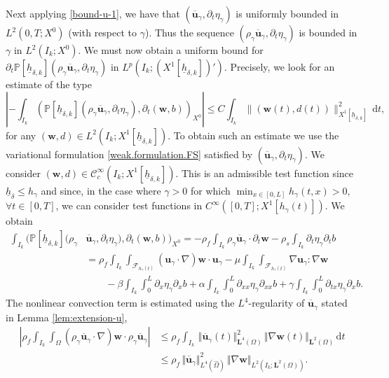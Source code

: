 \documentclass[11pt]{article}
\let\mathcal\mathscr
\theoremstyle{remark}
\theoremstyle{definition}
\newcommand{\norme}[1]{\,\Vert #1\Vert}
\newcommand{\ug}{\boldsymbol{u}}
\newcommand{\dd}{\,\mathrm{d}}
\newcommand{\wg}{\boldsymbol{w}}
\newcommand{\BS}[1]{\boldsymbol{#1}}
\let\CM\Omega
\newcommand{\CMT}{\widehat{\Omega}}
\newcommand{\hb}{{\underline{h}}}
\begin{document}
Next applying \eqref{bound-u-1}, we have that $(\overline{\ug}_{\gamma},\partial_{t}\eta_{\gamma})$ is uniformly bounded in $L^{2}(0,T;X^0)$ (with respect to $\gamma$). Thus the sequence $(\rho_{\gamma}\overline{\ug}_{\gamma},\partial_{t}\eta_{\gamma})$ is bounded in $\gamma$ in $L^{2}(I_{k};X^0)$. We must now obtain a uniform bound for
$\partial_{t}\mathbb{P}[\hb_{\delta, k}](\rho_{\gamma}\overline{\ug}_{\gamma},\partial_{t}\eta_{\gamma})$ in $L^p(I_k; (X^1[\hb_{\delta,k}])')$. Precisely, we look for an estimate of the type
\[
\left| -\int_{I_{k}}\left( \mathbb{P}[\hb_{\delta, k}](\rho_{\gamma}\overline{\ug}_{\gamma},\partial_{t}\eta_{\gamma}), \partial_{t}(\wg,b) \right)_{X^0}
\right| \leq C \int_{I_k} \|(\wg(t),d(t))\|_{X^1[\hb_{\delta,k}]}^{2}
\dd t,
\]
for any $(\wg,d) \in L^2(I_k; X^1[\hb_{\delta,k}])$.
To obtain such an estimate we use the variational formulation \eqref{weak.formulation.FS} satisfied by $(\overline{\ug}_{\gamma},\partial_{t}\eta_{\gamma})$. We consider
$(\wg,d) \in \mathcal C^{\infty}_c(I_k; X^1[\hb_{\delta,k}])$. This is an admissible test function since $\hb_{\delta}\leq h_\gamma$ and since, in the case where \hbox{$\gamma>0$} for which $\min_{x\in [0, L]}h_\gamma(t, x)>0$, $\forall t\in [0, T]$, we can consider test functions in $C^{\infty}([0, T]; X^1[h_\gamma(t)])$.
We obtain
\begin{align*}
\int_{I_{k}}\bigl( \mathbb{P}[\hb_{\delta, k}](\rho_{\gamma}&\overline{\ug}_{\gamma},\partial_{t}\eta_{\gamma}), \partial_{t}(\wg,b) \bigr)_{X^0}=-\rho_{f}\int_{I_{k}}\rho_{\gamma}\overline{\ug}_{\gamma}\cdot\partial_{t}\wg - \rho_{s}\int_{I_{k}}\partial_{t}\eta_{\gamma}\partial_{t}b\\
&=\rho_{f}\int_{I_{k}}\int_{\mathcal{F}_{h_\gamma(t)}}({\ug}_{\gamma}\cdot\nabla)\wg\cdot{\ug}_{\gamma}-\mu\int_{I_{k}}\int_{\mathcal{F}_{h_\gamma(t)}}\nabla{\ug_\gamma}:\nabla \wg\\
& \qquad -\beta\int_{I_{k}}\int_{0}^{L}\partial_{x}\eta_{\gamma}\partial_{x}b+ \alpha\int_{I_{k}}\int_{0}^{L}\partial_{xx}\eta_{\gamma}\partial_{xx}b +\gamma\int_{I_{k}}\int_{0}^{L}\partial_{tx}\eta_{\gamma}\partial_{x}b.
\end{align*}
The nonlinear convection term is estimated using the $L^{4}$-regularity of $\overline{\ug}_{\gamma}$ stated in Lemma \ref{lem:extension-u},
\[\begin{aligned}
\left\vert\rho_{f} \int_{I_{k}}\int_{\CM}(\rho_{\gamma}\overline{\ug}_{\gamma}\cdot\nabla)\wg\cdot\rho_{\gamma}\overline{\ug}_{\gamma}\right\vert&{}\leq \rho_{f}\int_{I_{k}}\norme{\overline{\ug}_{\gamma}(t)}_{\BS{L}^{4}(\CM)}^{2}\norme{\nabla\wg(t)}_{\BS{L}^{2}(\CM)}\dd t\\
&\leq \rho_{f}\norme{\overline{\ug}_{\gamma}}_{L^{4}(\CMT)}^{2}\norme{\nabla\wg}_{L^{2}(I_{k};\BS{L}^{2}(\CM))}.
\end{aligned}
\]
\end{document}
